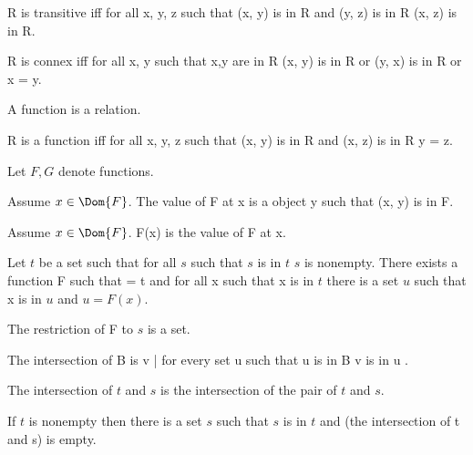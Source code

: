 \documentclass{article}
\begin{document}
\begin{forthel}
    \begin{definition}
      R is transitive iff for all x, y, z such that (x, y) is in R and (y, z) is in R (x, z) is in R.
    \end{definition}

    \begin{definition}
      R is connex iff for all x, y such that x,y are in R
        (x, y) is in R or (y, x) is in R or x = y.
    \end{definition}

    \begin{signature}
      A function is a relation.
    \end{signature}

    \begin{axiom}[FunctionIntro]
      R is a function iff for all x, y, z such that (x, y) is in R and (x, z) is in R y = z.
    \end{axiom}

    Let $F, G$ denote functions.

    \begin{definition}
      Assume $x \in \Dom{F}$.
      The value of F at x is a object y such that (x, y) is in F.
    \end{definition}

    \begin{definition}
      Assume $x \in \Dom{F}$.
      F(x) is the value of F at x.
    \end{definition}

    \begin{axiom}[Choice]
      Let $t$ be a set such that for all $s$ such that $s$ is in $t$ $s$ is nonempty.
        There exists a function F such that  = t
        and for all x such that x is in $t$ there is a set $u$ such that x is in $u$ and $u = F(x)$.
    \end{axiom}

    \begin{axiom}[Replacement]
      The restriction of F to $s$ is a set.
    \end{axiom}

    \begin{definition}
      The intersection of B is { v | for every set u such that u is in B v is in u }.
    \end{definition}

    \begin{definition}
      The intersection of $t$ and $s$ is the intersection of the pair of $t$ and $s$.
    \end{definition}

    \begin{axiom}[Restriction]
      If $t$ is nonempty then there is a set $s$ such that $s$ is in $t$ and
        (the intersection of t and s) is empty.
    \end{axiom}
  \end{forthel}
\end{document}
